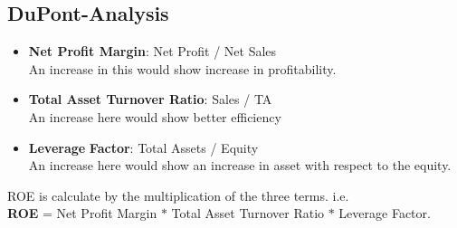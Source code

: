 \documentclass{article}
\begin{document}
\subsection{DuPont-Analysis}
\begin{itemize}
    \item \textbf{Net Profit Margin}: Net Profit / Net Sales\\
    An increase in this would show increase in profitability.
    \item \textbf{Total Asset Turnover Ratio}: Sales / TA\\
    An increase here would show better efficiency
    \item \textbf{Leverage} \textbf{Factor}: Total Assets / Equity\\
    An increase here would show an increase in asset with respect to the equity. 
    \end{itemize}
    ROE is calculate by the multiplication of the three terms. i.e. \\
    \textbf{ROE} = Net Profit Margin $*$ Total Asset Turnover Ratio $*$ Leverage Factor.
\end{document}
